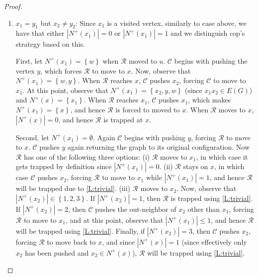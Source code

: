 \documentclass[a4paper,12pt]{amsart}
\newcommand{\set}[1]{\left\{#1\right\}}
\newcommand{\R}{\mathcal{R}}
\newcommand{\C}{\mathcal{C}}
\newenvironment{proofofclaim}{%
  \renewcommand{\proofname}{Proof of Claim}\proof}{\endproof}
\let\leq\leqslant
\begin{document}
\begin{proof}
\begin{proofofclaim}
\begin{enumerate}
\begin{enumerate}
                Second, suppose $|N^+(x_1)| = 0$. Here, $\C$ begins with pushing $y$, which forces $\R$ to move to $x$. Next, $\C$ pushes $y$ again, returning the graph to its initial configuration. Now, $\R$ can either (i) stay on $x$, (ii) move to $x_1$, or (iii) move to  $x_2$. (i) If $\R$ stays on $x$, then $\C$ pushes $x_2$, forcing $\R$ to move to $x_1$, and since $|N^+(x_1)| \leq 1$ at this point of time, it will be trapped at $x_1$ due to \cref{L:trivial}. (ii) If $\R$ moves to $x_1$, then observe that it is trapped since $|N^+(x_1)|=0$. (iii) If $\R$ moves to $x_2$, then either $|N^+(x_2)| =1$, i.e., $N^+(x_2) = \set{x_1}$, or $|N^+(x_2)| = 2$, i.e., $N^+(x_2) = \set{x_1,w'}$ for some $w'\in V(\overrightarrow{G})$. If $|N^+(x_2)|=1$, then $\R$ gets trapped via an application of \cref{L:trivial}. If $N^+(x_2) = \set{x_1,w'}$, then cop pushes $w'$, forcing $\R$ to move to $x_1$. Observe that $|N^+(x_1)|\leq 1$ at this point since $|N^+(x_1)| =0$ before $\C$ pushed $w'$. Hence, $\R$ will be trapped via an application of \cref{L:trivial}.  


                \item $x_1=y_1$ but $x_2\neq y_2$: Since $x_1$ is a visited vertex, similarly to case above, we have that either $|N^+(x_1)| = 0$ or $|N^+(x_1)| = 1$ and we distinguish cop's strategy based on this.

                First, let $N^+(x_1) = \set {w}$ when $\R$ moved to $u$. $\C$ begins with pushing the vertex $y$, which forces $\R$ to move to $x$. Now, observe that $N^+(x_1) = \set{w,y}$. When $\R$ reaches $x$, $\C$ pushes $x_2$, forcing $\C$ to move to $x_1$. At this point, observe that $N^+(x_1) = \set{x_2,y,w}$ (since $x_1x_2\in E(G)$) and $N^+(x) =\set{x_1}$. When $\R$ reaches $x_1$, $\C$ pushes $x_1$, which makes  $N^+(x_1) = \set{x}$, and hence $\R$ is forced to moved to $x$. When $\R$ moves to $x$, $|N^+(x)|=0$, and hence $\R$ is trapped at $x$.

                Second, let $N^+(x_1) = \emptyset$. Again $\C$ begins with pushing $y$, forcing $\R$ to move to $x$. $\C$ pushes $y$ again returning the graph to its original configuration. Now $\R$ has one of the following three options: (i) $\R$ moves to $x_1$, in which case it gets trapped by definition since $|N^+(x_1)| = 0$.
                (ii) $\R$ stays on $x$, in which case $\C$ pushes $x_2$, forcing $\R$ to move to $x_1$ while $|N^+(x_1)| = 1$, and hence $\R$ will be trapped due to \cref{L:trivial}. (iii) $\R$ moves to $x_2$. Now, observe that $|N^+(x_2)| \in \set{1,2,3}$. If $|N^+(x_2)| =1$, then $\R$ is trapped using \cref{L:trivial}. If $|N^+(x_2)|=2$, then $\C$ pushes the out-neighbor of $x_2$ other than $x_1$, forcing $\R$ to move to $x_1$, and at this point, observe that $|N^+(x_1)| \leq 1$, and hence $\R$ will be trapped using \cref{L:trivial}. Finally, if $|N^+(x_2)| = 3$, then $\C$ pushes $x_2$, forcing $\R$ to move back to $x$, and since $|N^+(x)| =1$ (since effectively only $x_2$ has been pushed and $x_2\in N^+(x)$), $\R$ will be trapped using \cref{L:trivial}. 


\end{enumerate}
\end{enumerate}
\end{proofofclaim}
\end{proof}
\end{document}
